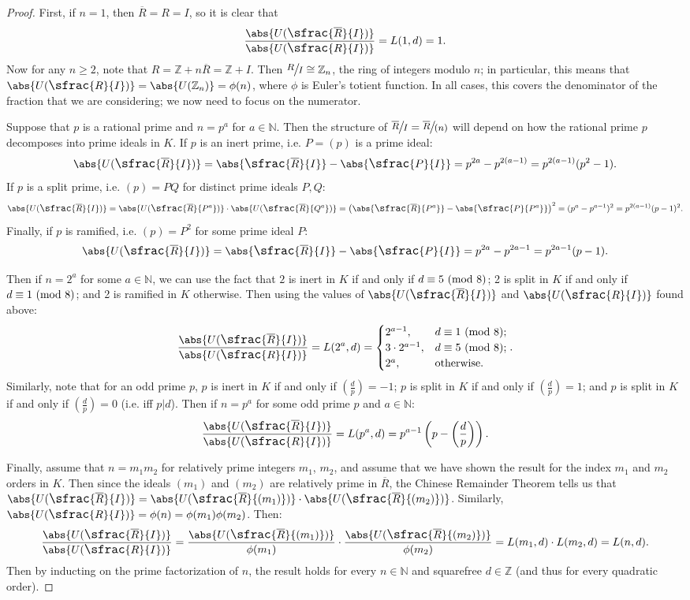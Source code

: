 \documentclass[12pt]{amsart}
\theoremstyle{definition}
\newcommand{\kron}[2]{\left(\frac{#1}{#2}\right)}
\newcommand{\bZ}{\mathbb Z}
\newcommand{\bN}{\mathbb N}
\newcommand{\Rbar}{\overline{R}}
\newcommand{\modulo}[1]{\textup{ (mod }#1)}
\newcommand{\ow}{\textup{otherwise}}
\newcommand{\quot}[2]{\large\sfrac{#1}{#2}\normalsize}
\begin{document}
	\begin{proof}
		First, if $n=1$, then $\Rbar=R=I$, so it is clear that
		$$\frac{\abs{U(\quot{\Rbar}{I})}}{\abs{U(\quot{R}{I})}}=L(1,d)=1.$$
		Now for any $n\geq 2$, note that $R=\bZ+n\Rbar=\bZ+I$. Then $\quot{R}{I}\cong \bZ_n$, the ring of integers modulo $n$; in particular, this means that $\abs{U(\quot{R}{I})}=\abs{U(\bZ_n)}=\phi(n)$, where $\phi$ is Euler's totient function. In all cases, this covers the denominator of the fraction that we are considering; we now need to focus on the numerator.
		
		Suppose that $p$ is a rational prime and $n=p^a$ for $a\in\bN$. Then the structure of $\quot{\Rbar}{I}=\quot{\Rbar}{(n)}$ will depend on how the rational prime $p$ decomposes into prime ideals in $K$. If $p$ is an inert prime, i.e. $P=(p)$ is a prime ideal: $$\abs{U(\quot{\Rbar}{I})}=\abs{\quot{\Rbar}{I}}-\abs{\quot{P}{I}}=p^{2a}-p^{{2(a-1)}}=p^{2(a-1)}(p^2-1).$$
		If $p$ is a split prime, i.e. $(p)=PQ$ for distinct prime ideals $P,Q$:
		$$\abs{U(\quot{\Rbar}{I})}=\abs{U(\quot{\Rbar}{P^a})}\cdot \abs{U(\quot{\Rbar}{Q^a})}=\left(\abs{\quot{\Rbar}{P^a}}-\abs{\quot{P}{P^a}}\right)^2=(p^a-p^{a-1})^2=p^{2(a-1)}(p-1)^2.$$
		Finally, if $p$ is ramified, i.e. $(p)=P^2$ for some prime ideal $P$:
		$$\abs{U(\quot{\Rbar}{I})}=\abs{\quot{\Rbar}{I}}-\abs{\quot{P}{I}}=p^{2a}-p^{{2a-1}}=p^{2a-1}(p-1).$$
		
		Then if $n=2^a$ for some $a\in\bN$, we can use the fact that $2$ is inert in $K$ if and only if $d\equiv 5\modulo{8}$; 2 is split in $K$ if and only if $d\equiv 1\modulo{8}$; and 2 is ramified in $K$ otherwise. Then using the values of $\abs{U(\quot{\Rbar}{I})}$ and $\abs{U(\quot{R}{I})}$ found above:
		$$\frac{\abs{U(\quot{\Rbar}{I})}}{\abs{U(\quot{R}{I})}}=L(2^a,d)=\begin{cases} 2^{a-1},&d\equiv 1\modulo{8};\\3\cdot 2^{a-1},&d\equiv 5\modulo{8};\\2^a,&\ow.\end{cases}.$$
		Similarly, note that for an odd prime $p$, $p$ is inert in $K$ if and only if $\kron{d}{p}=-1$; $p$ is split in $K$ if and only if $\kron{d}{p}=1$; and $p$ is split in $K$ if and only if $\kron{d}{p}=0$ (i.e. iff $p|d$). Then if $n=p^a$ for some odd prime $p$ and $a\in\bN$:
		$$\frac{\abs{U(\quot{\Rbar}{I})}}{\abs{U(\quot{R}{I})}}=L(p^a,d)=p^{a-1}\left(p-\kron{d}{p}\right).$$
		
		Finally, assume that $n=m_1m_2$ for relatively prime integers $m_1$, $m_2$, and assume that we have shown the result for the index $m_1$ and $m_2$ orders in $K$. Then since the ideals $(m_1)$ and $(m_2)$ are relatively prime in $\Rbar$, the Chinese Remainder Theorem tells us that $\abs{U(\quot{\Rbar}{I})}=\abs{U(\quot{\Rbar}{(m_1)})}\cdot \abs{U(\quot{\Rbar}{(m_2)})}$. Similarly, $\abs{U(\quot{R}{I})}=\phi(n)=\phi(m_1)\phi(m_2)$. Then:
		$$\frac{\abs{U(\quot{\Rbar}{I})}}{\abs{U(\quot{R}{I})}}=\frac{\abs{U(\quot{\Rbar}{(m_1)})}}{\phi(m_1)}\cdot \frac{\abs{U(\quot{\Rbar}{(m_2)})}}{\phi(m_2)}=L(m_1,d)\cdot L(m_2,d)=L(n,d).$$
		Then by inducting on the prime factorization of $n$, the result holds for every $n\in\bN$ and squarefree $d\in\bZ$ (and thus for every quadratic order).
	\end{proof}
	
\end{document}
